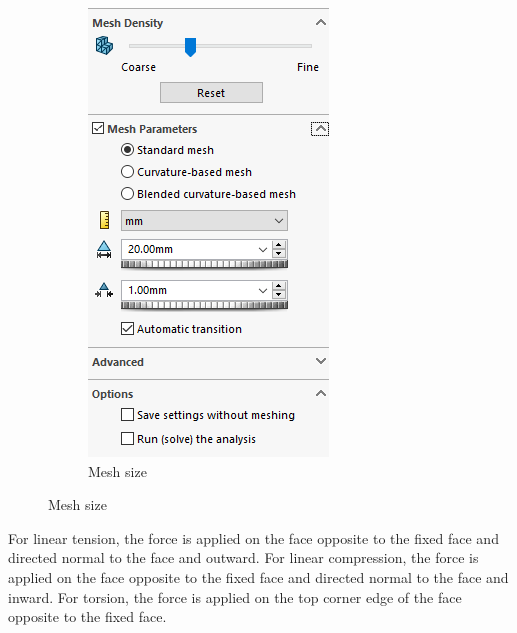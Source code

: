 \documentclass[12pt, letterpaper]{article}
\begin{document}
\begin{figure}[H]
\begin{subfigure}[t]{.3\linewidth}
		\includegraphics[width=\linewidth]{./procedure/mesh}
		\caption{Mesh size}
		\label{fig:settings-mesh}
	\end{subfigure}
\end{figure}

For linear tension, the force is applied on the face opposite to the fixed face and directed normal to the face and outward. 
For linear compression, the force is applied on the face opposite to the fixed face and directed normal to the face and inward.
For torsion, the force is applied on the top corner edge of the face opposite to the fixed face.
\end{document}
